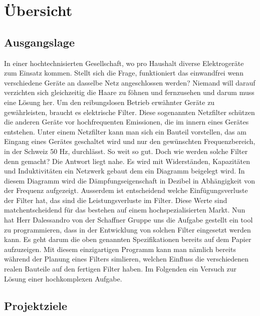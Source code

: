 \section{Übersicht} \label{sec:uebersicht}
\subsection{Ausgangslage}


In einer hochtechnisierten Gesellschaft, wo pro Haushalt diverse Elektrogeräte zum Einsatz kommen. Stellt sich die Frage, funktioniert das einwandfrei wenn verschiedene Geräte an dasselbe Netz angeschlossen werden?
Niemand will darauf verzichten sich gleichzeitig die Haare zu föhnen und fernzusehen und darum muss eine Lösung her. Um den reibungslosen Betrieb erwähnter Geräte zu gewährleisten, braucht es elektrische Filter. Diese sogenannten Netzfilter schützen die anderen Geräte vor hochfrequenten Emissionen, die im innern eines Gerätes entstehen. Unter einem Netzfilter kann man sich ein Bauteil vorstellen, das am Eingang eines Gerätes geschaltet wird und nur den gewünschten Frequenzbereich, in der Schweiz 50 Hz, durchlässt. 
So weit so gut. Doch wie werden solche Filter denn gemacht?
Die Antwort liegt nahe. Es wird mit Widerständen, Kapazitäten und Induktivitäten ein Netzwerk gebaut dem ein Diagramm beigelegt wird. In diesem Diagramm wird die Dämpfungseigenschaft in Dezibel in Abhängigkeit von der Frequenz aufgezeigt. Ausserdem ist entscheidend welche Einfügungsverluste der Filter hat, das sind die Leistungsverluste im Filter. 
Diese Werte sind matchentscheidend für das bestehen auf einem hochspezialisierten Markt. 
Nun hat Herr Dalessandro von der Schaffner Gruppe uns die Aufgabe gestellt ein tool zu programmieren, dass in der Entwicklung von solchen Filter eingesetzt werden kann. Es geht darum die oben genannten Spezifikationen bereits auf dem Papier aufzuzeigen. Mit diesem einzigartigen Programm kann man nämlich bereits während der Planung eines Filters simlieren, welchen Einfluss die verschiedenen realen Bauteile auf den fertigen Filter haben.
Im Folgenden ein Versuch zur Lösung einer hochkomplexen Aufgabe. 
 

\newpage
\subsection{Projektziele} \label{subsec:projektziele}




